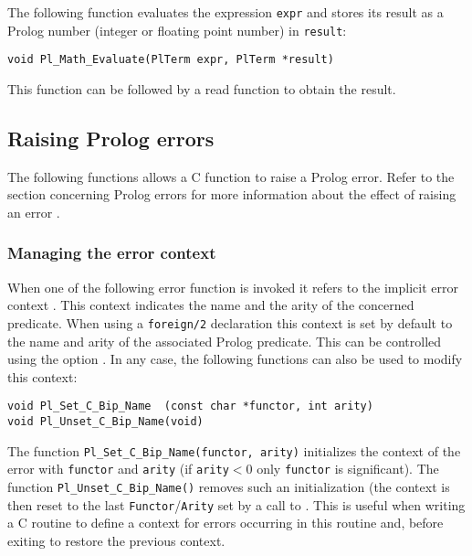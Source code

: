 The following function evaluates the expression \texttt{expr} and stores its
result as a Prolog number (integer or floating point number) in
\texttt{result}:

\begin{Indentation}
\begin{verbatim}
void Pl_Math_Evaluate(PlTerm expr, PlTerm *result)
\end{verbatim}
\end{Indentation}

This function can be followed by a read function 
to obtain the result.

\subsection{Raising Prolog errors}
\label{Raising-Prolog-errors}
The following functions allows a C function to raise a Prolog error. Refer
to the section concerning Prolog errors for more information about the
effect of raising an error .

\subsubsection{Managing the error context}
When one of the following error function is invoked it refers to the
implicit error context . This
context indicates the name and the arity of the concerned predicate. When
using a \texttt{foreign/2} declaration this context is set by default to the
name and arity of the associated Prolog predicate. This can be controlled
using the  option . In any
case, the following functions can also be used to modify this context:

\begin{Indentation}
\begin{verbatim}
void Pl_Set_C_Bip_Name  (const char *functor, int arity)
void Pl_Unset_C_Bip_Name(void)
\end{verbatim}
\end{Indentation}

The function \texttt{Pl\_Set\_C\_Bip\_Name(functor, arity)} initializes the
context of the error with \texttt{functor} and \texttt{arity} (if
\texttt{arity}$<$0 only \texttt{functor} is significant). The function
\texttt{Pl\_Unset\_C\_Bip\_Name()} removes such an initialization (the context
is then reset to the last \texttt{Functor}/\texttt{Arity} set by a call to
 . This is useful when
writing a C routine to define a context for errors occurring in this routine
and, before exiting to restore the previous context.

